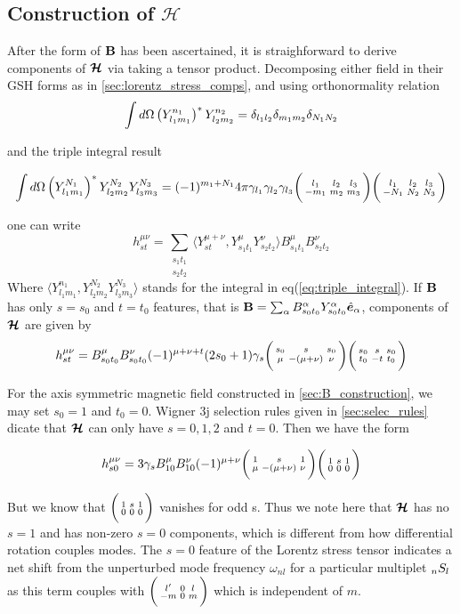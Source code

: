 \subsection{Construction of $\mathcal{H}$}

After the form of $\mathbf{B}$ has been ascertained, it is straighforward to derive components of $\bm{\mathcal{H}}$ via taking a tensor product. Decomposing either field in their GSH forms as in \ref{sec:lorentz_stress_comps}, and using orthonormality relation
\begin{equation}
\int d\Omega \left( Y_{l_1m_1}^{n_1} \right)^*Y_{l_2m_2}^{n_2} = \delta_{l_1l_2}\delta_{m_1m_2}\delta_{N_1N_2}
\end{equation}

and the triple integral result

\begin{equation}\label{eq:triple_integral}
\int d\Omega \left( Y_{l_1m_1}^{N_1} \right)^*Y_{l_2m_2}^{N_2}  Y_{l_3m_3}^{N_3}= (-1)^{m_1+N_1}4\pi \gamma_{l_1}\gamma_{l_2}\gamma_{l_3} \bigg(\begin{smallmatrix} l_1 & l_2 & l_3 \\-m_1 & m_2 & m_3 \end{smallmatrix}\bigg) \bigg(\begin{smallmatrix} l_1 & l_2 & l_3 \\-N_1 & N_2 & N_3 \end{smallmatrix}\bigg)
\end{equation}

one can write
\begin{equation}
h^{\mu\nu}_{st} = \sum_{\substack{s_1t_1\\ s_2t_2}} \langle Y_{st}^{\mu+\nu}, Y_{s_1 t_1}^{\mu}  Y_{s_2 t_2}^{\nu}\rangle B_{s_1t_1}^{\mu} B_{s_2t_2}^{\nu}
\end{equation}
Where $\langle Y_{l_1m_1}^{n_1}, Y_{l_2m_2}^{N_2}  Y_{l_3m_3}^{N_3}\rangle$ stands for the integral in eq(\ref{eq:triple_integral}).
If $\mathbf{B}$ has only $s=s_0$ and $t=t_0$ features, that is $\mathbf{B} = \sum_{\alpha}B_{s_0t_0}^{\alpha}Y_{s_0t_0}^{\alpha} \hat{\bm{e}}_{\alpha}$, components of $\bm{\mathcal{H}}$ are given by
\begin{equation}\label{eq:single_feature_B}
h_{st}^{\mu\nu} = B^{\mu}_{s_0 t_0}B^{\nu}_{s_0 t_0} (-1)^{\mu + \nu + t} (2s_0+1) \gamma_{s} \bigg(\begin{smallmatrix} s_0 & s & s_0 \\\mu & -(\mu+\nu) & \nu \end{smallmatrix}\bigg) \bigg(\begin{smallmatrix} s_0 & s & s_0 \\t_0 & -t & t_0 \end{smallmatrix}\bigg)
\end{equation}

For the axis symmetric magnetic field constructed in \ref{sec:B_construction}, we may set $s_0=1$ and $t_0=0$. Wigner 3j selection rules given in \ref{sec:selec_rules} dicate that $\bm{\mathcal{H}}$ can only have $s=0,1,2$ and $t=0$. Then we have the form

\begin{equation}
h_{s0}^{\mu\nu} = 3 \gamma_{s} B^{\mu}_{10}B^{\nu}_{10} (-1)^{\mu + \nu} \bigg(\begin{smallmatrix} 1 & s & 1 \\\mu & -(\mu+\nu) & \nu \end{smallmatrix}\bigg) \bigg(\begin{smallmatrix} 1 & s & 1 \\0 & 0 & 0 \end{smallmatrix}\bigg)
\end{equation}

But we know that $\bigg(\begin{smallmatrix} 1 & s & 1 \\0 & 0 & 0 \end{smallmatrix}\bigg)$ vanishes for odd s. Thus we note here that $\bm{\mathcal{H}}$ has no $s=1$ and has non-zero $s=0$ components, which is different from how differential rotation couples modes. The $s=0$ feature of the Lorentz stress tensor indicates a net shift from the unperturbed mode frequency $\omega_{{nl}}$ for a particular multiplet $_{n}S_{l}$ as this term couples with $\bigg(\begin{smallmatrix} l' & 0 & l \\-m & 0 & m \end{smallmatrix}\bigg)$ which is independent of $m$.